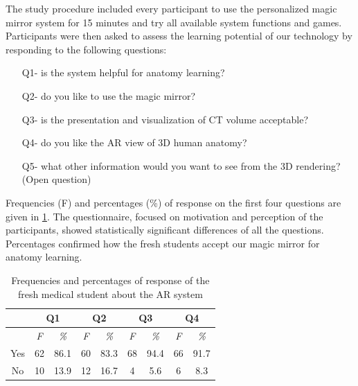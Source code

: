 {{{{{{The study procedure included every participant to use the personalized magic mirror system for 15 minutes and try all available system functions and games. Participants were then asked to assess the learning potential of our technology by responding to the following questions:
\begin{itemize}
	\item[Q1-] is the system helpful for anatomy learning?  
	\item[Q2-] do you like to use the magic mirror? 
	\item[Q3-] is the presentation and visualization of CT volume acceptable? 
	\item[Q4-] do you like the AR view of 3D human anatomy? 
	\item[Q5-] what other information would you want to see from the 3D rendering? (Open question)
\end{itemize}
Frequencies (F) and percentages (\%) of response on the first four questions are given in \tablename{\ref{tb:3-MMC:userStudy}}. The questionnaire, focused on motivation and perception of the participants, showed statistically significant differences of all the questions. Percentages confirmed how the fresh students accept our magic mirror for anatomy learning.
\begin{table}
	\caption[User study with fresh medical students]{Frequencies and percentages of response of the fresh medical student about the AR system}
	\centering
	\label{tb:3-MMC:userStudy}
	\scriptsize
	\begin{center}
		\begin{tabular}{ccccccccc}
			\multicolumn{1}{c}{\space} & \multicolumn{2}{c}{\textbf{Q1}} & \multicolumn{2}{c}{\textbf{Q2}} & \multicolumn{2}{c}{\textbf{Q3}} & \multicolumn{2}{c}{\textbf{Q4}} \\
			\hline
			\space & \textit{F} &\textit{\%}& \textit{F} &\textit{\%}& \textit{F} &\textit{\%}& \textit{F} &\textit{\%} \\
			Yes & 62 & 86.1 & 60 & 83.3 & 68 & 94.4 & 66 & 91.7 \\
			No & 10 & 13.9 & 12 & 16.7 & 4 & 5.6 & 6 & 8.3 \\
			\hline
		\end{tabular}
	\end{center}
\end{table}

}}}}}}

